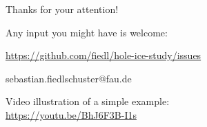 
\begin{frame}{Thanks for your attention!}
  \begin{center}
    Any input you might have is welcome: \\ \vspace{0.3cm}

    \url{https://github.com/fiedl/hole-ice-study/issues} \\ \vspace{0.1cm}

    sebastian.fiedlschuster@fau.de

    \vspace{1.5cm}

    \small{
      Video illustration of a simple example: \\
      \url{https://youtu.be/BhJ6F3B-I1s}
    }

  \end{center}
\end{frame}

